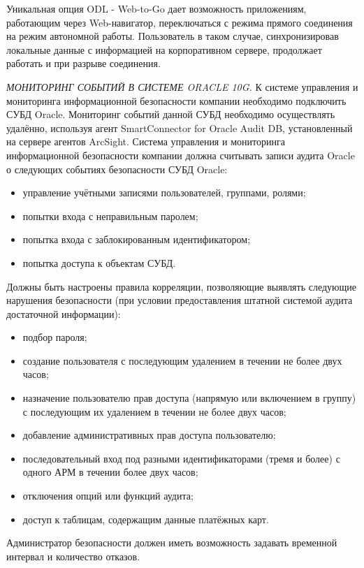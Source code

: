 Уникальная опция ODL - Web-to-Go дает возможность приложениям, работающим через Web-навигатор, переключаться с режима прямого соединения на режим автономной работы. Пользователь в таком случае, синхронизировав локальные данные с информацией на корпоративном сервере, продолжает работать и при разрыве соединения.

\textit{МОНИТОРИНГ СОБЫТИЙ В СИСТЕМЕ ORACLE 10G.}
К системе управления и мониторинга информационной безопасности компании необходимо подключить СУБД Oracle. Мониторинг событий данной СУБД необходимо осуществлять удалённо, используя агент SmartConnector for Oracle Audit DB, установленный на сервере агентов ArcSight.
Система управления и мониторинга информационной безопасности компании должна считывать записи аудита Oracle о следующих событиях безопасности СУБД Oracle:
\begin{itemize}
    \item управление учётными записями пользователей, группами, ролями;
    \item попытки входа с неправильным паролем;
    \item попытка входа с заблокированным идентификатором;
    \item попытка доступа к объектам СУБД.
\end{itemize}

Должны быть настроены правила корреляции, позволяющие выявлять следующие нарушения безопасности (при условии предоставления штатной системой аудита достаточной информации):
\begin{itemize}
    \item подбор пароля;
    \item создание пользователя с последующим удалением в течении не более двух часов;
    \item назначение пользователю прав доступа (напрямую или включением в группу) с последующим их удалением в течении не более двух часов;
    \item добавление административных прав доступа пользователю;
    \item последовательный вход под разными идентификаторами (тремя и более) с одного АРМ в течении более двух часов;
    \item отключения опций или функций аудита;
    \item доступ к таблицам, содержащим данные платёжных карт.
\end{itemize}

Администратор безопасности должен иметь возможность задавать временной интервал и количество отказов.

